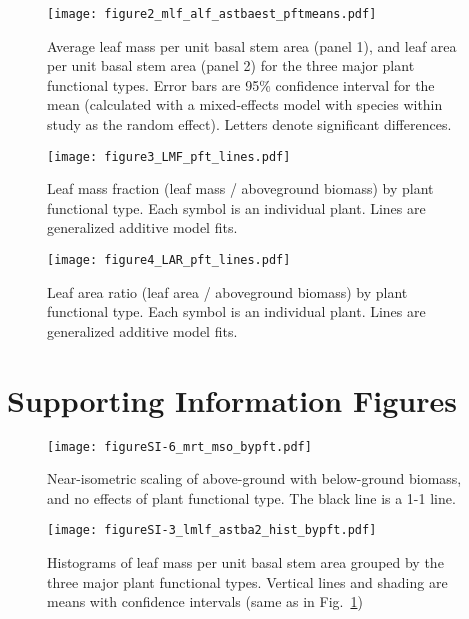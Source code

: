 \documentclass[a4paper]{article}
\begin{document}
\begin{figure}[h!]
    \centering
    \texttt{[image: figure2\_mlf\_alf\_astbaest\_pftmeans.pdf]}
    \caption{Average leaf mass per unit basal stem area (panel 1), and leaf area per unit basal stem area (panel 2) for the three major plant functional types. Error bars are 95\% confidence interval for the mean (calculated with a mixed-effects model with species within study as the random effect). Letters denote significant differences. }
    \label{fig:figure2}
\end{figure}


\begin{figure}[h!]
    \centering
    \texttt{[image: figure3\_LMF\_pft\_lines.pdf]}
    \caption{Leaf mass fraction (leaf mass / aboveground biomass) by plant functional type. Each symbol is an individual plant. Lines are generalized additive model fits.}
    \label{fig:figure3}
\end{figure}

\begin{figure}[h!]
    \centering
    \texttt{[image: figure4\_LAR\_pft\_lines.pdf]}
    \caption{Leaf area ratio (leaf area / aboveground biomass) by plant functional type. Each symbol is an individual plant. Lines are generalized additive model fits.}
    \label{fig:figure4}
\end{figure}


\clearpage
\section{Supporting Information Figures}

\begin{figure}[h!]
    \centering
    \texttt{[image: figureSI-6\_mrt\_mso\_bypft.pdf]}
    \caption{Near-isometric scaling of above-ground with below-ground biomass, and no effects of plant functional type. The black line is a 1-1 line.}
    \label{fig:figureSI6}
\end{figure}

\begin{figure}[h!]
    \centering
    \texttt{[image: figureSI-3\_lmlf\_astba2\_hist\_bypft.pdf]}
    \caption{Histograms of leaf mass per unit basal stem area grouped by the three major plant functional types. Vertical lines and shading are means with confidence intervals (same as in Fig.~\ref{fig:figure2})}
    \label{fig:figureSI3}
\end{figure}
\end{document}
